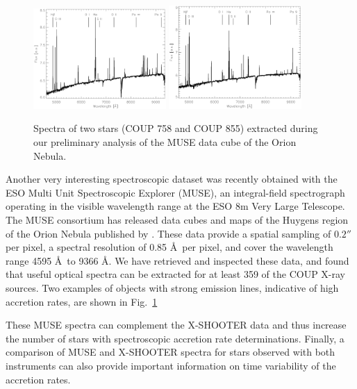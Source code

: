 \documentclass[10pt,fleqn,twoside]{article}
\begin{document}
\begin{figure} %
\centering
\includegraphics[width=0.45\textwidth]{plot_COUP_758.ps}
\includegraphics[width=0.45\textwidth]{plot_COUP_855.ps}
\caption{
Spectra of two stars (COUP 758 and COUP 855) extracted during our preliminary analysis
of the MUSE data cube of the Orion Nebula.
\label{muse-spectra.fig}}
\end{figure} %


Another very interesting spectroscopic dataset was recently
obtained with the 
ESO Multi Unit Spectroscopic Explorer (MUSE), 
an integral-field spectrograph operating in the visible wavelength range
at the ESO 8m Very Large Telescope.
%
The MUSE consortium has released 
data cubes and maps of the Huygens region of the Orion Nebula
published by \citep{Weilbacher15}. %
%
These data provide a spatial sampling of $0.2''$ per pixel, 
a spectral resolution of 0.85 \AA \, per pixel, and 
cover the wavelength range 4595 \AA \, to 9366 \AA.
%
We have retrieved and inspected these data, and found that useful
optical spectra can be extracted for at least 359 of the 
COUP X-ray sources.
Two examples of objects with strong emission lines, indicative 
of high accretion rates, are shown in Fig.~\ref{muse-spectra.fig} 

These MUSE spectra can complement the X-SHOOTER data and thus increase 
the number of stars with spectroscopic accretion rate determinations.
Finally, a comparison of MUSE and X-SHOOTER spectra for stars observed
with both instruments can also provide important information 
on time variability of the accretion rates.
\end{document}
